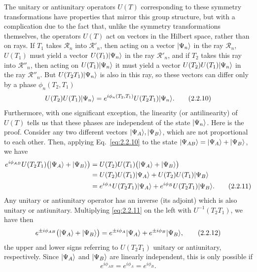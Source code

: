 The unitary or antiunitary operators $U(T)$ corresponding to these
symmetry transformations have properties that mirror this group structure,
but with a complication due to the fact that, unlike the symmetry
transformations themselves, the operators $U(T)$ act on vectors in the
Hilbert space, rather than on rays. If $T_1$ takes $\mathcal{R}_n$ into
$\mathcal{R}'_n$, then acting on a vector $\lvert \Psi_n\rangle$ in the ray
$\mathcal{R}_n$, $U(T_1)$ must yield a vector $U(T_1)\lvert \Psi_n\rangle$ in the
ray $\mathcal{R}'_n$, and if $T_2$ takes this ray into $\mathcal{R}''_n$,
then acting on $U(T_1)\lvert \Psi_n\rangle$ it must yield a vector
$U(T_2)U(T_1)\lvert \Psi_n\rangle$ in the ray $\mathcal{R}''_n$. But
$U(T_2T_1)\lvert \Psi_n\rangle$ is also in this ray, so these vectors can differ
only by a phase $\phi_n(T_2,T_1)$
\begin{equation}
  U(T_2)U(T_1)\lvert \Psi_n\rangle
    =e^{i\phi_n(T_2,T_1)}U(T_2T_1)\lvert \Psi_n\rangle.
  \tag{2.2.10}\label{eq:2.2.10}
\end{equation}
Furthermore, with one significant exception, the linearity (or
antilinearity) of $U(T)$ tells us that these phases are independent of the
state $\lvert \Psi_n\rangle$. Here is the proof. Consider any two different vectors
$\lvert \Psi_A\rangle,\lvert \Psi_B\rangle$, which are not proportional to each other.
Then, applying Eq.~\eqref{eq:2.2.10} to the state
$\lvert \Psi_{AB}\rangle=\lvert \Psi_A\rangle+\lvert \Psi_B\rangle$, we have
\begin{align}
  e^{i\phi_{AB}}U(T_2T_1)
    \bigl(\lvert \Psi_A\rangle+\lvert \Psi_B\rangle\bigr)
  &=U(T_2)U(T_1)\bigl(\lvert \Psi_A\rangle+\lvert \Psi_B\rangle\bigr)\notag\\
  &=U(T_2)U(T_1)\lvert \Psi_A\rangle
    +U(T_2)U(T_1)\lvert \Psi_B\rangle\notag\\
  &=e^{i\phi_A}U(T_2T_1)\lvert \Psi_A\rangle
    +e^{i\phi_B}U(T_2T_1)\lvert \Psi_B\rangle.
  \tag{2.2.11}\label{eq:2.2.11}
\end{align}
Any unitary or antiunitary operator has an inverse (its adjoint) which
is also unitary or antiunitary. Multiplying \eqref{eq:2.2.11} on the left with
$U^{-1}(T_2T_1)$, we have then
\begin{equation}
  e^{\pm i\phi_{AB}}\bigl(\lvert \Psi_A\rangle+\lvert \Psi_B\rangle\bigr)
    =e^{\pm i\phi_A}\lvert \Psi_A\rangle
      +e^{\pm i\phi_B}\lvert \Psi_B\rangle,
  \tag{2.2.12}\label{eq:2.2.12}
\end{equation}
the upper and lower signs referring to $U(T_2T_1)$ unitary or antiunitary,
respectively. Since $\lvert \Psi_A\rangle$ and $\lvert \Psi_B\rangle$ are linearly
independent, this is only possible if
\begin{equation}
  e^{i\phi_{AB}}=e^{i\phi_A}=e^{i\phi_B}.
  \tag{2.2.13}\label{eq:2.2.13}
\end{equation}
